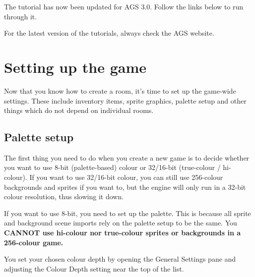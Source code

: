 The tutorial has now been updated for AGS 3.0. Follow the links below
to run through it.










For the latest version of the tutorials, always check the AGS website.


\section{Setting up the game}\label{Settingupthegame}%

Now that you know how to create a room, it's time to set up the game-wide
settings. These include inventory items, sprite graphics, palette setup
and other things which do not depend on individual rooms.

\subsection{Palette setup}\label{PalSetup}%

The first thing you need to do when you create a new game is to decide whether
you want to use 8-bit (palette-based) colour or 32/16-bit (true-colour / hi-colour).
If you want to use 32/16-bit colour, you can still use 256-colour backgrounds and
sprites if you want to, but the engine will only run in a 32-bit colour
resolution, thus slowing it down.

If you want to use 8-bit, you need to set up the
palette. This is because all sprite and background scene imports rely on the
palette setup to be the same. You \bf{CANNOT} use hi-colour nor true-colour sprites or backgrounds
in a 256-colour game.

You set your chosen colour depth by opening the General Settings pane and
adjusting the Colour Depth setting near the top of the list.

